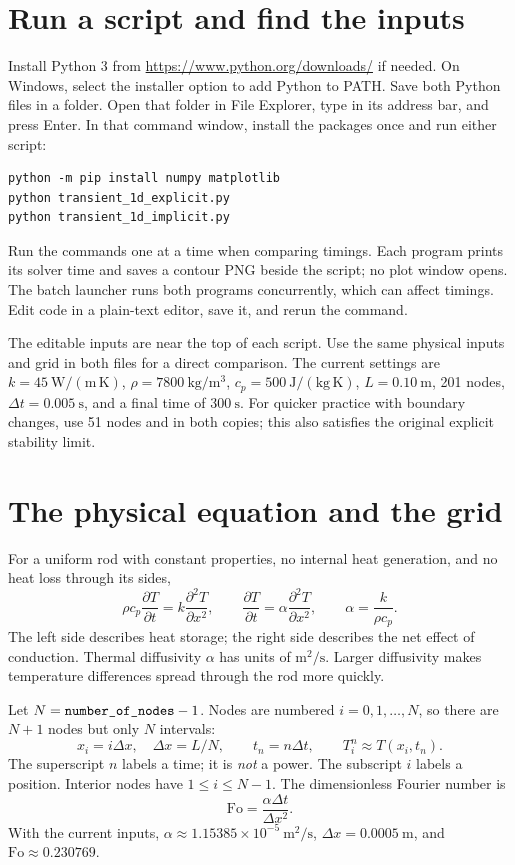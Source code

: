 \documentclass[11pt,letterpaper]{article}
\newcommand{\Fo}{\mathrm{Fo}}
\newcommand{\code}[1]{\texttt{\detokenize{#1}}}
\begin{document}
\section{Run a script and find the inputs}
Install Python 3 from \url{https://www.python.org/downloads/} if needed.
On Windows, select the installer option to add Python to PATH.
Save both Python files in a folder. Open that folder in File Explorer,
type \code{cmd} in its address bar, and press Enter. In that command
window, install the packages once and run either script:
\begin{lstlisting}[style=terminal]
python -m pip install numpy matplotlib
python transient_1d_explicit.py
python transient_1d_implicit.py
\end{lstlisting}
Run the commands one at a time when comparing timings. Each program prints
its solver time and saves a contour PNG beside the script; no plot window
opens. The batch launcher runs both programs concurrently, which can affect
timings. Edit code in a plain-text editor, save it, and rerun the command.


The editable inputs are near the top of each script. Use the same physical
inputs and grid in both files for a direct comparison. The current settings
are $k=45\ \mathrm{W/(m\,K)}$, $\rho=7800\ \mathrm{kg/m^3}$,
$c_p=500\ \mathrm{J/(kg\,K)}$, $L=0.10\ \mathrm m$, 201 nodes,
$\Delta t=0.005\ \mathrm s$, and a final time of $300\ \mathrm s$.
For quicker practice with boundary changes, use 51 nodes and
\code{dt = 0.1} in both copies; this also satisfies the original explicit
stability limit.


\section{The physical equation and the grid}
For a uniform rod with constant properties, no internal heat generation,
and no heat loss through its sides,
\begin{equation}
 \rho c_p\frac{\partial T}{\partial t}
 =k\frac{\partial^2T}{\partial x^2},\qquad
 \frac{\partial T}{\partial t}
 =\alpha\frac{\partial^2T}{\partial x^2},\qquad
 \alpha=\frac{k}{\rho c_p}.
\end{equation}
The left side describes heat storage; the right side describes the net
effect of conduction. Thermal diffusivity $\alpha$ has units of
$\mathrm{m^2/s}$. Larger diffusivity makes temperature differences spread
through the rod more quickly.


Let $N=\code{number_of_nodes}-1$. Nodes are numbered $i=0,1,\ldots,N$,
so there are $N+1$ nodes but only $N$ intervals:
\[
 x_i=i\Delta x,\quad \Delta x=L/N,\qquad
 t_n=n\Delta t,\qquad T_i^n\approx T(x_i,t_n).
\]
The superscript $n$ labels a time; it is \emph{not} a power. The subscript
$i$ labels a position. Interior nodes have $1\le i\le N-1$.
The dimensionless Fourier number is
\[
 \Fo=\frac{\alpha\Delta t}{\Delta x^2}.
\]
With the current inputs, $\alpha\approx1.15385\times10^{-5}\ \mathrm{m^2/s}$,
$\Delta x=0.0005\ \mathrm m$, and $\Fo\approx0.230769$.
\end{document}
